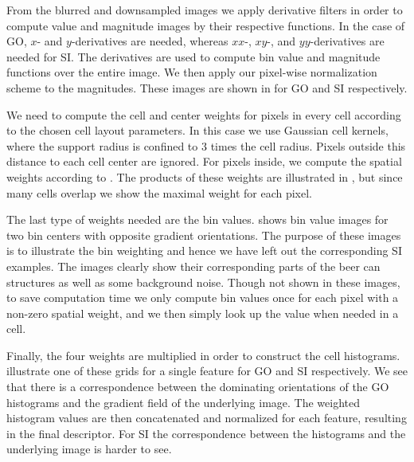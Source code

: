 \documentclass[thesis.tex]{subfiles}
\begin{document}
From the blurred and downsampled images we apply derivative filters in order to compute value and magnitude images by their respective functions. In the case of GO, $x$- and $y$-derivatives are needed, whereas $xx$-, $xy$-, and $yy$-derivatives are needed for SI. The derivatives are used to compute bin value and magnitude functions over the entire image. We then apply our pixel-wise normalization scheme to the magnitudes. These images are shown in  for GO and SI respectively.

We need to compute the cell and center weights for pixels in every cell according to the chosen cell layout parameters. In this case we use Gaussian cell kernels, where the support radius is confined to $3$ times the cell radius. Pixels outside this distance to each cell center are ignored. For pixels inside, we compute the spatial weights according to . The products of these weights are illustrated in , but since many cells overlap we show the maximal weight for each pixel.

The last type of weights needed are the bin values.  shows bin value images for two bin centers with opposite gradient orientations. The purpose of these images is to illustrate the bin weighting and hence we have left out the corresponding SI examples. The images clearly show their corresponding parts of the beer can structures as well as some background noise. Though not shown in these images, to save computation time we only compute bin values once for each pixel with a non-zero spatial weight, and we then simply look up the value when needed in a cell.

Finally, the four weights are multiplied in order to construct the cell histograms.  illustrate one of these grids for a single feature for GO and SI respectively. We see that there is a correspondence between the dominating orientations of the GO histograms and the gradient field of the underlying image. The weighted histogram values are then concatenated and normalized for each feature, resulting in the final descriptor. For SI the correspondence between the histograms and the underlying image is harder to see.
\end{document}
